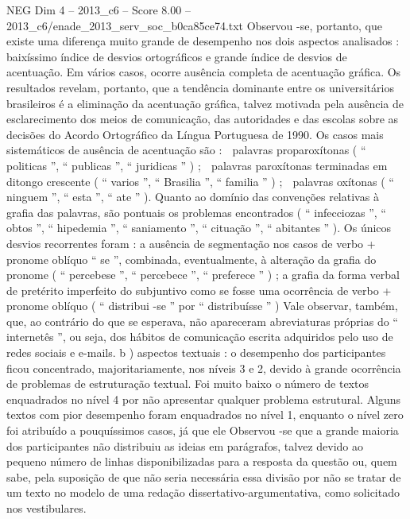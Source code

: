 \begin{textsample}{NEG Dim 4 – 2013\_c6 – Score 8.00 – 2013\_c6/enade\_2013\_serv\_soc\_b0ca85ce74.txt}
Observou -se, portanto, que existe uma diferença muito grande de desempenho nos dois aspectos analisados : baixíssimo índice de desvios ortográficos e grande índice de desvios de acentuação.
Em vários casos, ocorre ausência completa de acentuação gráfica.
Os resultados revelam, portanto, que a tendência dominante entre os universitários brasileiros é a eliminação da acentuação gráfica, talvez motivada pela ausência de esclarecimento dos meios de comunicação, das autoridades e das escolas sobre as decisões do Acordo Ortográfico da Língua Portuguesa de 1990.
Os casos mais sistemáticos de ausência de acentuação são :  palavras proparoxítonas ( “ politicas ”, “ publicas ”, “ juridicas ” ) ;  palavras paroxítonas terminadas em ditongo crescente ( “ varios ”, “ Brasilia ”, “ familia ” ) ;  palavras oxítonas ( “ ninguem ”, “ esta ”, “ ate ” ).
Quanto ao domínio das convenções relativas à grafia das palavras, são pontuais os problemas encontrados ( “ infecciozas ”, “ obtos ”, “ hipedemia ”, “ saniamento ”, “ cituação ”, “ abitantes ” ).
Os únicos desvios recorrentes foram : a ausência de segmentação nos casos de verbo + pronome oblíquo “ se ”, combinada, eventualmente, à alteração da grafia do pronome ( “ percebese ”, “ percebece ”, “ preferece ” ) ; a grafia da forma verbal de pretérito imperfeito do subjuntivo como se fosse uma ocorrência de verbo + pronome oblíquo ( “ distribui -se ” por “ distribuísse ” ) Vale observar, também, que, ao contrário do que se esperava, não apareceram abreviaturas próprias do “ internetês ”, ou seja, dos hábitos de comunicação escrita adquiridos pelo uso de redes sociais e e-mails. b ) aspectos textuais : o desempenho dos participantes ficou concentrado, majoritariamente, nos níveis 3 e 2, devido à grande ocorrência de problemas de estruturação textual.
Foi muito baixo o número de textos enquadrados no nível 4 por não apresentar qualquer problema estrutural.
Alguns textos com pior desempenho foram enquadrados no nível 1, enquanto o nível zero foi atribuído a pouquíssimos casos, já que ele Observou -se que a grande maioria dos participantes não distribuiu as ideias em parágrafos, talvez devido ao pequeno número de linhas disponibilizadas para a resposta da questão ou, quem sabe, pela suposição de que não seria necessária essa divisão por não se tratar de um texto no modelo de uma redação dissertativo-argumentativa, como solicitado nos vestibulares.

\end{textsample}
